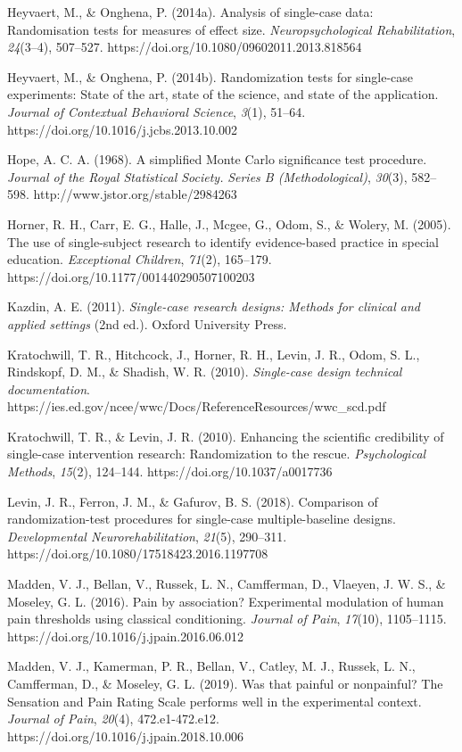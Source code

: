 \documentclass{article}
\begin{document}
Heyvaert, M., \& Onghena, P. (2014a). Analysis of single-case data: Randomisation tests for measures of effect size. \emph{Neuropsychological Rehabilitation}, \emph{24}(3--4), 507--527. https://doi.org/10.1080/09602011.2013.818564

Heyvaert, M., \& Onghena, P. (2014b). Randomization tests for single-case experiments: State of the art, state of the science, and state of the application. \emph{Journal of Contextual Behavioral Science}, \emph{3}(1), 51--64. https://doi.org/10.1016/j.jcbs.2013.10.002

Hope, A. C. A. (1968). A simplified Monte Carlo significance test procedure. \emph{Journal of the Royal Statistical Society. }\emph{Series B (Methodological)}, \emph{30}(3), 582--598. http://www.jstor.org/stable/2984263

Horner, R. H., Carr, E. G., Halle, J., Mcgee, G., Odom, S., \& Wolery, M. (2005). The use of single-subject research to identify evidence-based practice in special education. \emph{Exceptional Children}, \emph{71}(2), 165--179. https://doi.org/10.1177/001440290507100203

Kazdin, A. E. (2011). \emph{Single-case research designs: Methods for clinical and applied settings} (2nd ed.). Oxford University Press.

Kratochwill, T. R., Hitchcock, J., Horner, R. H., Levin, J. R., Odom, S. L., Rindskopf, D. M., \& Shadish, W. R. (2010). \emph{Single-case design technical documentation}. https://ies.ed.gov/ncee/wwc/Docs/ReferenceResources/wwc\_scd.pdf

Kratochwill, T. R., \& Levin, J. R. (2010). Enhancing the scientific credibility of single-case intervention research: Randomization to the rescue. \emph{Psychological Methods}, \emph{15}(2), 124--144. https://doi.org/10.1037/a0017736

Levin, J. R., Ferron, J. M., \& Gafurov, B. S. (2018). Comparison of randomization-test procedures for single-case multiple-baseline designs. \emph{Developmental Neurorehabilitation}, \emph{21}(5), 290--311. https://doi.org/10.1080/17518423.2016.1197708

Madden, V. J., Bellan, V., Russek, L. N., Camfferman, D., Vlaeyen, J. W. S., \& Moseley, G. L. (2016). Pain by association? Experimental modulation of human pain thresholds using classical conditioning. \emph{Journal of Pain}, \emph{17}(10), 1105--1115. https://doi.org/10.1016/j.jpain.2016.06.012

Madden, V. J., Kamerman, P. R., Bellan, V., Catley, M. J., Russek, L. N., Camfferman, D., \& Moseley, G. L. (2019). Was that painful or nonpainful? The Sensation and Pain Rating Scale performs well in the experimental context. \emph{Journal of Pain}, \emph{20}(4), 472.e1-472.e12. https://doi.org/10.1016/j.jpain.2018.10.006
\end{document}
